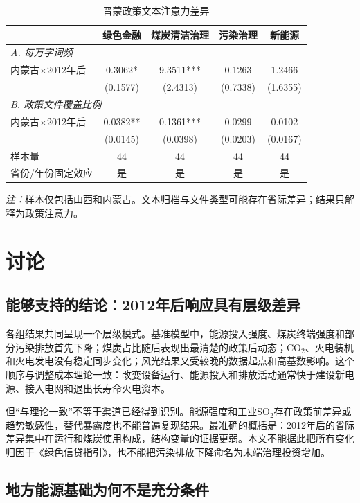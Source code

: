\documentclass[UTF8,12pt]{ctexart}
\newcommand{\note}[1]{\begin{minipage}{0.96\textwidth}\footnotesize\textit{注：}#1\end{minipage}}
\begin{document}
\begin{table}[H]
\centering
\caption{晋蒙政策文本注意力差异}
\label{tab:text}
\begin{tabular}{lcccc}
\toprule
 & 绿色金融 & 煤炭清洁治理 & 污染治理 & 新能源 \\
\midrule
\multicolumn{5}{l}{\textit{A. 每万字词频}}\\
内蒙古×2012年后 & 0.3062* & 9.3511*** & 0.1263 & 1.2466 \\
 & (0.1577) & (2.4313) & (0.7338) & (1.6355) \\
\midrule
\multicolumn{5}{l}{\textit{B. 政策文件覆盖比例}}\\
内蒙古×2012年后 & 0.0382** & 0.1361*** & 0.0299 & 0.0102 \\
 & (0.0145) & (0.0398) & (0.0203) & (0.0167) \\
\midrule
样本量 & 44 & 44 & 44 & 44 \\
省份/年份固定效应 & 是 & 是 & 是 & 是 \\
\bottomrule
\end{tabular}
\note{样本仅包括山西和内蒙古。文本归档与文件类型可能存在省际差异；结果只解释为政策注意力。}
\end{table}

\section{讨论}

\subsection{能够支持的结论：2012年后响应具有层级差异}

各组结果共同呈现一个层级模式。基准模型中，能源投入强度、煤炭终端强度和部分污染排放首先下降；煤炭占比随后表现出最清楚的政策后动态；CO$_2$、火电装机和火电发电没有稳定同步变化；风光结果又受较晚的数据起点和高基数影响。这个顺序与调整成本理论一致：改变设备运行、能源投入和排放活动通常快于建设新电源、接入电网和退出长寿命火电资本\parencite{portervanderlinde1995,unruh2000,geels2002}。

但“与理论一致”不等于渠道已经得到识别。能源强度和工业SO$_2$存在政策前差异或趋势敏感性，替代暴露度也不能普遍复现结果。最准确的概括是：2012年后的省际差异集中在运行和煤炭使用构成，结构变量的证据更弱。本文不能据此把所有变化归因于《绿色信贷指引》，也不能把污染排放下降命名为末端治理投资增加。

\subsection{地方能源基础为何不是充分条件}
\end{document}

